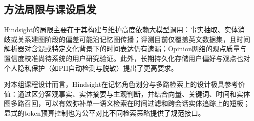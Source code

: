 \subsection{方法局限与课设启发}

Hindsight的局限主要在于其构建与维护高度依赖大模型调用：事实抽取、实体消歧或关系建图阶段的偏差可能沿记忆图传播；评测目前仅覆盖英文数据集，且时间解析器对含混或特定文化背景下的时间表达仍有遗漏；Opinion网络的观点质量与置信度校准尚待系统的用户研究验证。此外，长期持久化存储用户偏好与观点也对个人隐私保护（如PII自动检测与脱敏）提出了更高要求。

对本组课程设计而言，Hindsight在记忆角色划分与多路检索上的设计极具参考价值：通过区分客观事实、实体摘要与主观判断，并结合向量、关键词、时间和实体图多路召回，可以有效弥补单一语义检索在时间过滤和跨会话实体追踪上的短板；显式的token预算控制也为公平对比不同检索策略提供了规范接口。

